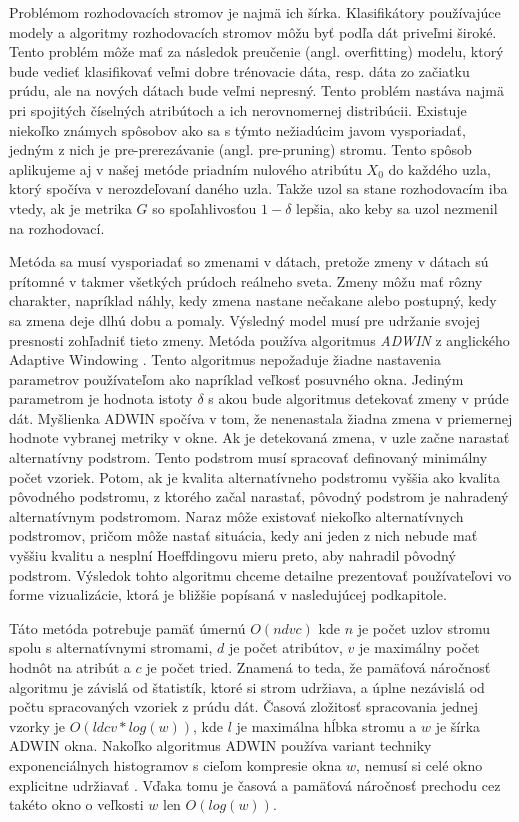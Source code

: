 \par
Problémom rozhodovacích stromov je najmä ich šírka. Klasifikátory používajúce modely a algoritmy rozhodovacích stromov môžu byť podľa dát priveľmi široké. Tento problém môže mať za následok preučenie (angl. overfitting) modelu, ktorý bude vedieť klasifikovať veľmi dobre trénovacie dáta, resp. dáta zo začiatku prúdu, ale na nových dátach bude veľmi nepresný. Tento problém nastáva najmä pri spojitých číselných atribútoch a ich nerovnomernej distribúcii. Existuje niekoľko známych spôsobov ako sa s týmto nežiadúcim javom vysporiadať, jedným z nich je pre-prerezávanie (angl. pre-pruning) stromu. Tento spôsob aplikujeme aj v našej metóde priadním nulového atribútu $X_0$ do každého uzla, ktorý spočíva v nerozdeľovaní daného uzla. Takže uzol sa stane rozhodovacím iba vtedy, ak je metrika $G$ so spoľahlivosťou $1-\delta$ lepšia, ako keby sa uzol nezmenil na rozhodovací.
\par
Metóda sa musí vysporiadať so zmenami v dátach, pretože zmeny v dátach sú prítomné v takmer všetkých prúdoch reálneho sveta. Zmeny môžu mať rôzny charakter, napríklad náhly, kedy zmena nastane nečakane alebo postupný, kedy sa zmena deje dlhú dobu a pomaly. Výsledný model musí pre udržanie svojej presnosti zohľadniť tieto zmeny. Metóda používa algoritmus \textit{ADWIN} z anglického Adaptive Windowing \citep{Hutchison2009}. Tento algoritmus nepožaduje žiadne nastavenia parametrov používateľom ako napríklad veľkosť posuvného okna. Jediným parametrom je hodnota istoty $\delta$ s akou bude algoritmus detekovať zmeny v prúde dát. Myšlienka ADWIN spočíva v tom, že nenenastala žiadna zmena v priemernej hodnote vybranej metriky v okne. Ak je detekovaná zmena, v uzle začne narastať alternatívny podstrom. Tento podstrom musí spracovať definovaný minimálny počet vzoriek. Potom, ak je kvalita alternatívneho podstromu vyššia ako kvalita pôvodného podstromu, z ktorého začal narastať, pôvodný podstrom je nahradený alternatívnym podstromom. Naraz môže existovať niekoľko alternatívnych podstromov, pričom môže nastať situácia, kedy ani jeden z nich nebude mať vyššiu kvalitu a nesplní Hoeffdingovu mieru preto, aby nahradil pôvodný podstrom. Výsledok tohto algoritmu chceme detailne prezentovať používateľovi vo forme vizualizácie, ktorá je bližšie popísaná v nasledujúcej podkapitole. 
\par
Táto metóda potrebuje pamäť úmernú $O(ndvc)$ kde $n$ je počet uzlov stromu spolu s alternatívnymi stromami, $d$ je počet atribútov, $v$ je maximálny počet hodnôt na atribút a $c$ je počet tried. Znamená to teda, že pamäťová náročnosť algoritmu je závislá od štatistík, ktoré si strom udržiava, a úplne nezávislá od počtu spracovaných vzoriek z prúdu dát. Časová zložitosť spracovania jednej vzorky je $O(ldcv * log(w))$, kde $l$ je maximálna hĺbka stromu a $w$ je šírka ADWIN okna. Nakoľko algoritmus ADWIN používa variant techniky exponenciálnych histogramov s cieľom kompresie okna $w$, nemusí si celé okno explicitne udržiavať \citep{datar2002maintaining}. Vďaka tomu je časová a pamäťová náročnosť prechodu cez takéto okno o veľkosti $w$ len $O(log(w))$.
